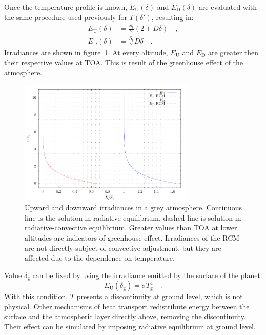 \documentclass[a4paper,10pt,twocolumn,\classoptions]{article}
\begin{document}
Once the temperature profile is known, $E_\text{U}(\delta)$ and $E_\text{D}(\delta)$ are evaluated with the same procedure used previously for $T(\delta')$, resulting in:
\begin{align}
  \label{eq:irradiance_upward_solution}
  E_\text{U}(\delta) & = \frac{S_\text{t}}{2} (2 + D \delta) \quad , \\
  \label{eq:irradiance_downward_solution}
  E_\text{D}(\delta) & = \frac{S_\text{t}}{2} D \delta
  \quad .
\end{align}
Irradiances are shown in figure~\ref{fig:irradiance}. At every altitude, $E_\text{U}$ and $E_\text{D}$ are greater then their respective values at TOA. This is result of the greenhouse effect of the atmosphere.
\begin{figure}[h]
  \centering
  \includegraphics*[keepaspectratio=true,width=0.75\textwidth]{irradiance}
  \caption{Upward and downward irradiances in a grey atmosphere. Continuous line is the solution in radiative equilibrium, dashed line is solution in radiative-convective equilibrium. Greater values than TOA at lower altitudes are indicators of greenhouse effect. Irradiances of the RCM are not directly subject of convective adjustment, but they are affected due to the dependence on temperature.}
  \label{fig:irradiance}
\end{figure}

Value $\delta_\text{g}$ can be fixed by using the irradiance emitted by the surface of the planet:
\begin{equation}
  \label{eq:irradiance_upward_ground}
  E_\text{U}(\delta_\text{g}) = \sigma T_\text{g}^4
  \quad .
\end{equation}
With this condition, $T$ presents a discontinuity at ground level, which is not physical. Other mechanisms of heat transport redistribute energy between the surface and the atmospheric layer directly above, removing the discontinuity. Their effect can be simulated by imposing radiative equilibrium at ground level.
\end{document}
